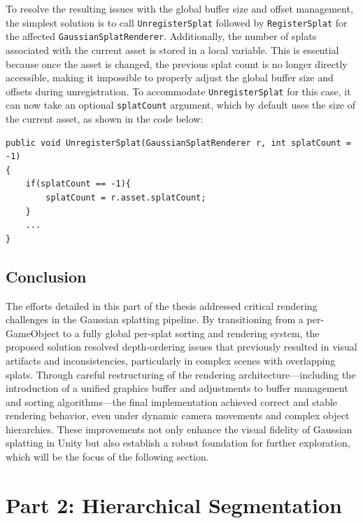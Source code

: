 \documentclass[12pt]{article}
\begin{document}
To resolve the resulting issues with the global buffer size and offset management, the simplest solution is to call \texttt{UnregisterSplat} followed by
\linebreak 
\texttt{RegisterSplat} for the affected \texttt{GaussianSplatRenderer}. Additionally, the number of splats associated with the current asset is stored in a local variable. This is essential because once the asset is changed, the previous splat count is no longer directly accessible, making it impossible to properly adjust the global buffer size and offsets during unregistration. To accommodate \texttt{UnregisterSplat} for this case, it can now take an optional \texttt{splatCount} argument, which by default uses the size of the current asset, as shown in the code below:
\begin{lstlisting}[tabsize=2,caption=A small adjustment to UnregisterSplat, label=code:unregister,breaklines=true,breakatwhitespace=true,basicstyle=\ttfamily\footnotesize]
public void UnregisterSplat(GaussianSplatRenderer r, int splatCount = -1)
{
	if(splatCount == -1){
		splatCount = r.asset.splatCount;
	}	
	...
}
\end{lstlisting}
\subsection{Conclusion}
The efforts detailed in this part of the thesis addressed critical rendering challenges in the Gaussian splatting pipeline. By transitioning from a per-GameObject to a fully global per-splat sorting and rendering system, the proposed solution resolved depth-ordering issues that previously resulted in visual artifacts and inconsistencies, particularly in complex scenes with overlapping splats. Through careful restructuring of the rendering architecture—including the introduction of a unified graphics buffer and adjustments to buffer management and sorting algorithms—the final implementation achieved correct and stable rendering behavior, even under dynamic camera movements and complex object hierarchies. These improvements not only enhance the visual fidelity of Gaussian splatting in Unity but also establish a robust foundation for further exploration, which will be the focus of the following section.
\section{Part 2: Hierarchical Segmentation}  
\end{document}
